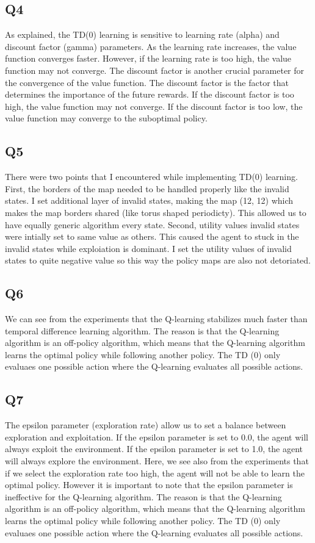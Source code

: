 \documentclass{assignment}
\begin{document}
\subsection{Q4}
As explained, the TD(0) learning is sensitive to learning rate (alpha) and discount factor (gamma) parameters. As the learning rate increases, the value function converges faster. However, if the learning rate is too high, the value function may not converge. The discount factor is another crucial parameter for the convergence of the value function. The discount factor is the factor that determines the importance of the future rewards. If the discount factor is too high, the value function may not converge. If the discount factor is too low, the value function may converge to the suboptimal policy.

\subsection{Q5}
There were two points that I encountered while implementing TD(0) learning. First, the borders of the map needed to be handled properly like the invalid states. I set additional layer of invalid states, making the map (12, 12) which makes the map borders shared (like torus shaped periodicty). This allowed us to have equally generic algorithm every state. Second, utility values invalid states were intially set to same value as others. This caused the agent to stuck in the invalid states while exploiation is dominant. I set the utility values of invalid states to quite negative value so this way the policy maps are also not detoriated.

\subsection{Q6}
We can see from the experiments that the Q-learning stabilizes much faster than temporal difference learning algorithm. The reason is   that the Q-learning algorithm is an off-policy algorithm, which means that the Q-learning algorithm learns the optimal policy while following another policy. The TD (0) only evaluaes one possible action where the Q-learning evaluates all possible actions.

\subsection{Q7}
The epsilon parameter (exploration rate) allow us to set a balance between exploration and exploitation. If the epsilon parameter is set to 0.0, the agent will always exploit the environment. If the epsilon parameter is set to 1.0, the agent will always explore the environment. Here, we see also from the experiments that if we select the exploration rate too high, the agent will not be able to learn the optimal policy. However it is important to note that the epsilon parameter is ineffective for the Q-learning algorithm. The reason is that the Q-learning algorithm is an off-policy algorithm, which means that the Q-learning algorithm learns the optimal policy while following another policy. The TD (0) only evaluaes one possible action where the Q-learning evaluates all possible actions.
\end{document}
